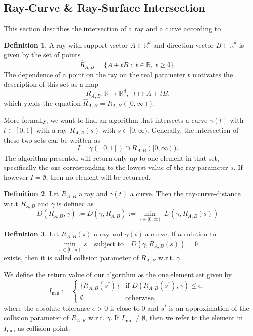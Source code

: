 \documentclass[a4paper, 11pt]{report}
\theoremstyle{definition}
\newtheorem{definition}{Definition}[section]
\begin{document}
\subsection{Ray-Curve \& Ray-Surface Intersection}\label{subsec:raymarching}
	This section describes the intersection of a ray and a curve according to \cite{Hart1996}.

	\begin{definition}
		A ray with support vector $A \in \mathbb{R}^d$ and direction vector $B \in \mathbb{R}^d$ is given by the set of points
			\begin{equation*}
				\hat R_{A,B} = \{A + tB \;:\; t \in \mathbb{R},\; t \geq 0\}.
			\end{equation*}
		The dependence of a point on the ray on the real parameter $t$ motivates the description of this set as a map
			$$R_{A,B}: \mathbb{R} \rightarrow \mathbb{R}^d,\;\; t \mapsto A+tB.$$
		which yields the equation $\hat R_{A,B} = R_{A,B}([0,\infty))$.
	\end{definition}

	More formally, we want to find an algorithm that intersects a curve $\gamma(t)$ with $t \in [0, 1]$ with a ray $R_{A,B}(s)$ with $s \in [0, \infty)$. Generally, the intersection of these two sets can be written as
		$$I = \gamma([0,1]) \cap R_{A,B}([0,\infty)).$$
	The algorithm presented will return only up to one element in that set, specifically the one corresponding to the lowest value of the ray parameter $s$. If however $I = \emptyset$, then no element will be returned.

	\begin{definition}
		Let $R_{A,B}$ a ray and $\gamma(t)$ a curve. Then the ray-curve-distance w.r.t $R_{A,B}$ and $\gamma$ is defined as
			$$ D(R_{A,B}, \gamma) := D(\gamma, R_{A,B}) := \underset{s\in[0,\infty)}{\min} \; D(\gamma, R_{A,B}(s))$$
	\end{definition}
	
	\begin{definition}\label{def:raycollisionparameter}
		Let $R_{A,B}(s)$ a ray and $\gamma(t)$ a curve. If a solution to 
			$$\underset{s\in[0,\infty)}{\min} \; s \quad \text{subject to} \quad D(\gamma, R_{A,B}(s)) = 0$$
		exists, then it is called collision parameter of $R_{A,B}$ w.r.t. $\gamma$.
	\end{definition}

	We define the return value of our algorithm as the one element set given by
		$$ I_{\min} := 
			\begin{cases}
				\{R_{A,B}(s^*)\} 	&\text{if } D(R_{A,B}(s^*), \gamma) \leq \epsilon, \\
				\emptyset			&\text{otherwise,}	
			\end{cases}
		$$
	where the absolute tolerance $\epsilon > 0$ is close to $0$ and $s^*$ is an approximation of the collision parameter of $R_{A,B}$ w.r.t. $\gamma$. If $I_{\min} \neq \emptyset$, then we refer to the element in $I_{\min}$ as collision point.
\end{document}
